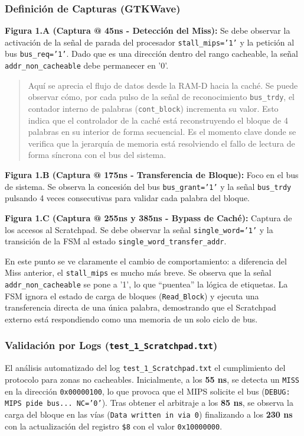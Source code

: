 \documentclass[12pt,a4paper]{article}
\begin{document}
\subsubsection*{Definición de Capturas (GTKWave)}

\textbf{Figura 1.A (Captura @ 45ns - Detección del Miss):}
Se debe observar la activación de la señal de parada del procesador \texttt{stall\_mips='1'} y la petición al bus \texttt{bus\_req='1'}. Dado que es una dirección dentro del rango cacheable, la señal \texttt{addr\_non\_cacheable} debe permanecer en '0'.

\begin{quote}
Aquí se aprecia el flujo de datos desde la RAM-D hacia la caché. Se puede observar cómo, por cada pulso de la señal de reconocimiento \texttt{bus\_trdy}, el contador interno de palabras (\texttt{cont\_block}) incrementa su valor. Esto indica que el controlador de la caché está reconstruyendo el bloque de 4 palabras en su interior de forma secuencial. Es el momento clave donde se verifica que la jerarquía de memoria está resolviendo el fallo de lectura de forma síncrona con el bus del sistema.
\end{quote}

\textbf{Figura 1.B (Captura @ 175ns - Transferencia de Bloque):}
Foco en el bus de sistema. Se observa la concesión del bus \texttt{bus\_grant='1'} y la señal \texttt{bus\_trdy} pulsando 4 veces consecutivas para validar cada palabra del bloque.

\textbf{Figura 1.C (Captura @ 255ns y 385ns - Bypass de Caché):} 
Captura de los accesos al Scratchpad. Se debe observar la señal \texttt{single\_word='1'} y la transición de la FSM al estado \texttt{single\_word\_transfer\_addr}.

 En este punto se ve claramente el cambio de comportamiento: a diferencia del Miss anterior, el \texttt{stall\_mips} es mucho más breve. Se observa que la señal \texttt{addr\_non\_cacheable} se pone a '1', lo que ``puentea'' la lógica de etiquetas. La FSM ignora el estado de carga de bloques (\texttt{Read\_Block}) y ejecuta una transferencia directa de una única palabra, demostrando que el Scratchpad externo está respondiendo como una memoria de un solo ciclo de bus.

\subsubsection*{Validación por Logs (\texttt{test\_1\_Scratchpad.txt})}

El análisis automatizado del log \texttt{test\_1\_Scratchpad.txt} el cumplimiento del protocolo para zonas no cacheables. Inicialmente, a los \textbf{55 ns}, se detecta un \texttt{MISS} en la dirección \texttt{0x00000100}, lo que provoca que el MIPS solicite el bus (\texttt{DEBUG: MIPS pide bus... NC='0'}). Tras obtener el arbitraje a los \textbf{85 ns}, se observa la carga del bloque en las vías (\texttt{Data written in via 0}) finalizando a los \textbf{230 ns} con la actualización del registro \texttt{\$8} con el valor \texttt{0x10000000}.
\end{document}
